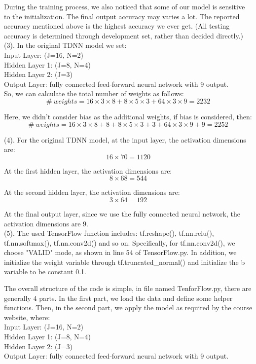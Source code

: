  During the training process, we also noticed that some of our model is sensitive to the initialization. The final output accuracy may varies a lot. The reported accuracy mentioned above is the highest accuracy we ever get. (All testing accuracy is determined through development set, rather than decided directly.)\\

(3). In the original TDNN model we set:\\
\indent Input Layer: (J=16, N=2)\\
\indent Hidden Layer 1: (J=8, N=4)\\
\indent Hidden Layer 2: (J=3)\\
\indent Output Layer: fully connected feed-forward neural network with 9 output.\\
So, we can calculate the total number of weights as follows:
$$ \# \  weights = 16 \times 3 \times 8 + 8 \times 5 \times 3 + 64 \times 3 \times 9 = 2232 $$

 Here, we didn't consider bias as the additional weights, if bias is considered, then:
$$ \# \  weights = 16 \times 3 \times 8 + 8 + 8 \times 5 \times 3 + 3 + 64 \times 3 \times 9 + 9 = 2252 $$

(4). For the original TDNN model, at the input layer, the activation dimensions are:
$$ 16 \times 70 = 1120 $$

At the first hidden layer, the activation dimensions are:
$$ 8 \times 68 = 544 $$

At the second hidden layer, the activation dimensions are:
$$ 3 \times 64 = 192 $$

At the final output layer, since we use the fully connected neural network, the activation dimensions are $9$.\\

(5). The used TensorFlow function includes: tf.reshape(), tf.nn.relu(), tf.nn.softmax(), tf.nn.conv2d() and so on. Specifically, for tf.nn.conv2d(), we choose "VALID" mode, as shown in line 54 of TensorFlow.py. In addition, we initialize the weight variable through tf.truncated{\_}normal() and initialize the b variable to be constant 0.1.

The overall structure of the code is simple, in file named TenforFlow.py, there are generally 4 parts. In the first part, we load the data and define some helper functions. Then, in the second part, we apply the model as required by the course website, where: \\
\indent Input Layer: (J=16, N=2)\\
\indent Hidden Layer 1: (J=8, N=4)\\
\indent Hidden Layer 2: (J=3)\\
\indent Output Layer: fully connected feed-forward neural network with 9 output.\\

